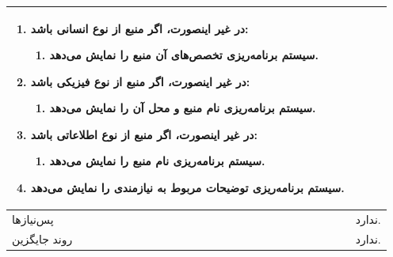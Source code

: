 \begin{table}[H]
\begin{tabular}{|p{3cm}|p{10cm}|}
\begin{enumerate}[topsep=0cm,leftmargin=0.5cm]
\begin{enumerate}[topsep=0cm,leftmargin=0.5cm]
				\item در غیر اینصورت، اگر منبع از نوع انسانی باشد:
				\begin{enumerate}[topsep=0cm,leftmargin=0.5cm]
					\item سیستم برنامه‌ریزی تخصص‌های آن منبع را نمایش می‌دهد.
				\end{enumerate}
				\item در غیر اینصورت، اگر منبع از نوع فیزیکی باشد:
				\begin{enumerate}[topsep=0cm,leftmargin=0.5cm]
					\item سیستم برنامه‌ریزی نام منبع و محل آن را نمایش می‌دهد.
				\end{enumerate}
				\item در غیر اینصورت، اگر منبع از نوع اطلاعاتی باشد:
				\begin{enumerate}[topsep=0cm,leftmargin=0.5cm]
					\item سیستم برنامه‌ریزی نام منبع را نمایش می‌دهد.
				\end{enumerate}	
				\item سیستم برنامه‌ریزی توضیحات مربوط به نیازمندی را نمایش می‌دهد.
			\end{enumerate}

		\end{enumerate} \\
		
		\hline
		پس‌نیازها & ندارد. \\
		\hline
		روند جایگزین & ندارد. \\
		\hline
	\end{tabular}
\end{table}


